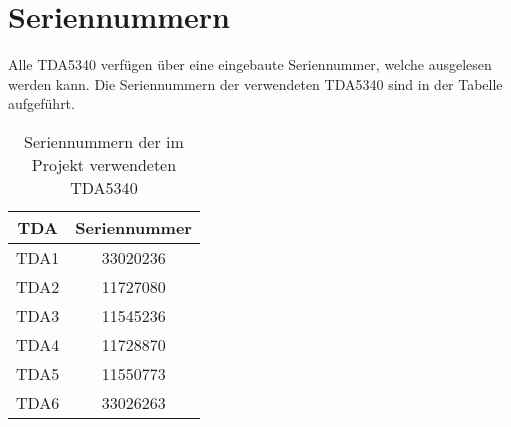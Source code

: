 \section{Seriennummern}
\label{app:Seriennummern}
Alle TDA5340 verfügen über eine eingebaute Seriennummer, welche ausgelesen werden kann. Die Seriennummern der verwendeten TDA5340 sind in der Tabelle aufgeführt.
\begin{table}[H]
	\centering
	\begin{tabular}{cc}
		TDA & Seriennummer\\
		\hline
		TDA1 & 33020236\\
		TDA2 & 11727080\\
		TDA3& 11545236\\
		TDA4& 11728870\\
		TDA5& 11550773\\
		TDA6& 33026263\\
	\end{tabular}
	\caption{Seriennummern der im Projekt verwendeten TDA5340 }
	\label{default}
\end{table}
